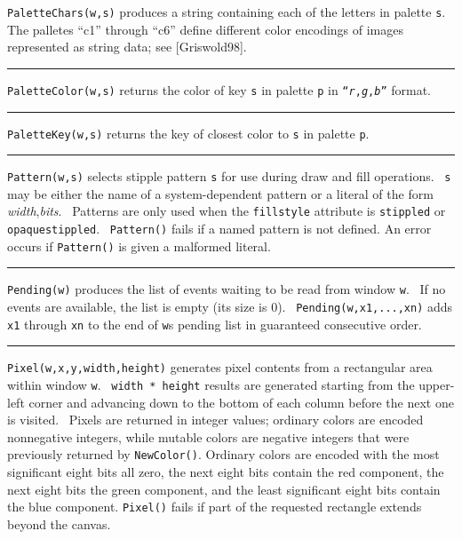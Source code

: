 \noindent
\texttt{PaletteChars(w,s)} produces a string containing each of the
letters in palette \texttt{s}. The palletes
{\textquotedblleft}c1{\textquotedblright} through
{\textquotedblleft}c6{\textquotedblright} define different color
encodings of images represented as string data; see [Griswold98].

\bigskip\hrule\vspace{0.1cm}

\noindent
\texttt{PaletteColor(w,s)} returns the color of key \texttt{s} in
palette \texttt{p} in
\texttt{{\textquotedblleft}}\texttt{\textit{r}}\texttt{,}\texttt{\textit{g}}\texttt{,}\texttt{\textit{b}}\texttt{{\textquotedblright}}
format.

\bigskip\hrule\vspace{0.1cm}

\noindent
\texttt{PaletteKey(w,s)} returns the key of closest color to \texttt{s}
in palette \texttt{p}.

\bigskip\hrule\vspace{0.1cm}

\noindent
\texttt{Pattern(w,s)} selects stipple pattern \texttt{s} for use during
draw and fill operations. \ \texttt{s} may be either the name of a
system-dependent pattern or a literal of the form
\textit{width},\textit{bits}. \ Patterns are only used when the
\texttt{fillstyle} attribute is \texttt{stippled} or
\texttt{opaquestippled}. \ \texttt{Pattern()} fails if a named pattern
is not defined. An error occurs if \texttt{Pattern()} is given a
malformed literal.

\bigskip\hrule\vspace{0.1cm}

\noindent
\texttt{Pending(w)} produces the list of events waiting to be read from
window \texttt{w}. \ If no events are available, the list is empty (its
size is 0). \ \texttt{Pending(w,x1,...,xn)} adds \texttt{x1} through
\texttt{xn} to the end of \texttt{w}{\textquotesingle}s pending list in
guaranteed consecutive order.

\bigskip\hrule\vspace{0.1cm}

\noindent
\texttt{Pixel(w,x,y,width,height)} generates pixel contents from a
rectangular area within window \texttt{w}. \ \texttt{width * height}
results are generated starting from the upper-left corner and advancing
down to the bottom of each column before the next one is visited.
\ Pixels are returned in integer values; ordinary colors are encoded
nonnegative integers, while mutable colors are negative integers that
were previously returned by \texttt{NewColor()}. Ordinary colors are
encoded with the most significant eight bits all zero, the next eight
bits contain the red component, the next eight bits the green
component, and the least significant eight bits contain the blue
component. \texttt{Pixel()} fails if part of the requested rectangle
extends beyond the canvas.

